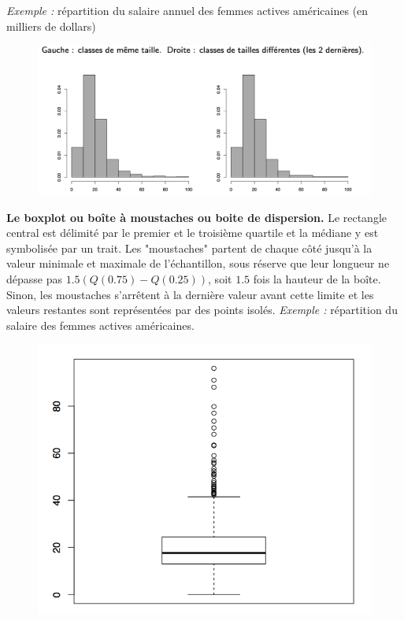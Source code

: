 \textit{Exemple :} répartition du salaire annuel des femmes actives américaines (en milliers de dollars)
\begin{figure}[H]\begin{center}\includegraphics[scale=0.7]{ilu/ccm10.png}\end{center}\end{figure}
\textbf{Le boxplot ou boîte à moustaches ou boite de dispersion.}\newline
Le rectangle central est délimité par le premier et le troisième quartile et la médiane y est symbolisée par un trait.
Les "moustaches" partent de chaque côté jusqu'à la valeur minimale et maximale de l'échantillon, sous réserve que leur longueur ne dépasse pas $1.5(Q(0.75) - Q(0.25))$, soit $1.5$ fois la hauteur de la boîte. Sinon, les moustaches s'arrêtent à la dernière valeur avant cette limite et les valeurs restantes sont représentées par des points isolés.\newline
\textit{Exemple :} répartition du salaire des femmes actives américaines.
\begin{figure}[H]\begin{center}\includegraphics[scale=0.7]{ilu/ccm11.png}\end{center}\end{figure}
